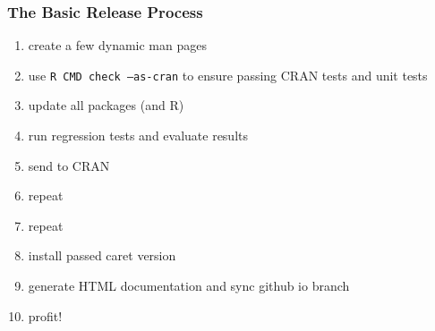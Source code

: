 \documentclass[12 pt]{beamer}\usepackage[]{graphicx}\usepackage[]{color}
\newcommand{\pkg}[1]{{\fontseries{b}\selectfont #1}}
\renewcommand{\pkg}[1]{{\color{darkgreen}\textsf{#1}}}
\begin{document}
  
  \begin{frame}[fragile]
\frametitle{The Basic Release Process}

\begin{enumerate}
  \item create a few dynamic man pages
  \item use {\color{darkred} \texttt{R CMD check --as-cran}} to ensure passing CRAN tests and {\color{darkred} unit tests}
  \item update all packages (and R)
  \item run {\color{darkred} regression tests} and evaluate results
  \item send to CRAN
  \item repeat
  \item repeat
  \item install passed \pkg{caret} version 
  \item generate {\color{darkred} HTML documentation} and sync github io branch
  \item profit!
\end{enumerate}

\end{frame}

  
\end{document}
